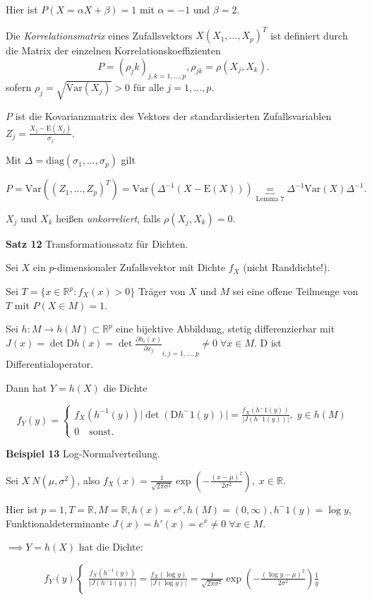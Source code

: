 \documentclass[12pt, a4paper]{article}
\newcommand{\E}{\mbox{I\negthinspace E}}
\theoremstyle{empty}
\newcommand{\R}{\mathbb{R}}
\newcommand{\1}{\mathds{1}}
\renewcommand{\E}{\mathrm{E}}
\newcommand{\Var}{\mathrm{Var}}
\newcommand{\diag}{\mathrm{diag}}
\providecommand{\abs}[1]{\lvert#1\rvert}
\providecommand{\mtext}[1]{\quad \text{#1} \quad}
\begin{document}
Hier ist $P(X=\alpha X + \beta) = 1$ mit $\alpha = -1$ und $\beta = 2$. 

Die \emph{Korrelationsmatrix} eines Zufallsvektors $X (X_1, \ldots, X_p)^T$ ist definiert durch die Matrix der einzelnen Korrelationskoeffizienten 
\[  P = (\rho_jk)_{j,k = 1,\ldots,p} , \rho_{jk} = \rho(X_j, X_k) . \] sofern $\rho_j = \sqrt{\Var(X_j)}>0$ für alle $j=1,\ldots,p$.


$P$ ist die Kovarianzmatrix des Vektors der standardisierten Zufallsvariablen \(  Z_j = \frac{ X_j - \E(X_j) }{ \sigma_j  }  .  \)

Mit $\Delta = \diag(\sigma_1,\ldots, \sigma_p)$ gilt

\[ P = \Var ((Z_1, \ldots, Z_p)^T) = \Var( \Delta^{-1}(X-\E(X))) \underbrace{=}_{\text{Lemma 7}} \Delta^{-1} \Var(X) \Delta^{-1} .    \]

$X_j$ und $X_k$ heißen \emph{unkorreliert}, falls $\rho(X_j, X_k) = 0$.

\textbf{Satz 12} Transformationssatz für Dichten.

Sei $X$ ein $p$-dimensionaler Zufallsvektor mit Dichte $f_X$ (nicht Randdichte!).

Sei  $T = \{ x \in \R^p: f_X (x) > 0  \}$ Träger von $X$ und $M$ sei eine offene Teilmenge von $T$ mit $P(X \in M) = 1$.

Sei $h: M \to h(M) \subset \R^p$ eine bijektive Abbildung, stetig differenzierbar mit $J(x) = \det{\mathrm{D}h(x)} = \det{\frac{\partial h_i (x)}{\partial x_j}}_{i,j = 1,\ldots,p} \neq 0 \; \forall x \in M$. $\mathrm{D}$ ist Differentialoperator.

Dann hat $Y = h(X)$ die Dichte

\[ f_Y (y) = \begin{cases} f_X (h^{-1} (y)) \abs{\det (\mathrm{D}h^-1 (y))} = \frac{f_X (h^-1 (y))}{\abs{J(h^-1(y))}}, \; y \in h(M)   \\ 0 \mtext{sonst.}    \end{cases}  \]


\textbf{Beispiel 13} Log-Normalverteilung.

Sei $X ~ N(\mu, \sigma^2)$, also $f_X (x) = \frac{1}{\sqrt{2\pi \sigma^2}} \exp{(-\frac{(x-\mu)^2}{2\sigma^2}), \; x \in \R}$.

Hier ist $p=1, T = \R, M = \R, h(x)=e^x, h(M) = (0, \infty), h^-1(y) = \log y$, Funktionaldeterminante $J(x) = h'(x) = e^x \neq 0 \; \forall x \in M$.

\(   \implies Y = h(X)  \) hat die Dichte:

\[  f_Y (y) \begin{cases} \frac{ f_X (h^{-1}(y))}{\abs{J(h^-1 (y))}} = \frac{f_X (\log y)}{\abs{J(\log y)}}  = \frac{1}{\sqrt{2\pi\sigma^2}} \exp(-\frac{ (\log y - \mu)^2 }{2\sigma^2}) \frac{1}{y} \end{cases}     \]
\end{document}
